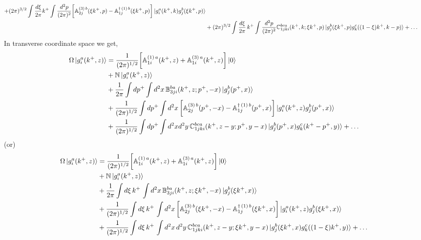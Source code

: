 \documentclass[10pt]{article}
\def\mf#1{\mathbb{#1}}
\numberwithin{equation}{section}
\begin{document}
\begin{itemize}
\begin{align}
    + (2\pi)^{3/2}\int \frac{d\xi}{2\pi} k^{+}\int \frac{d^2p}{(2\pi)^2}  \bigg[\mf{A}^{(3)\, b}_{2j}(\xi k^{+}, p) - \mf{A}^{\dagger\, (1)\, b}_{1j}(\xi k^{+},p)\bigg]  \ket{g^{a}_{i}(k^{+},k)g^{b}_{j}(\xi k^{+},p)} \notag \\ & 
    + (2\pi)^{3/2}\int \frac{d\xi}{2\pi}\, k^{+} \int \frac{d^{2}p}{(2\pi)^{2}}\mf{C}^{bca}_{1jki}(k^{+}, k; \xi k^{+}, p)\ket{g^{b}_{j}(\xi k^{+}, p)g^{c}_{k}((1-\xi)k^{+}, k-p)} %
    + \ldots 
\end{align}
In transverse coordinate space we get,
\begin{align}\label{Omegaongpos}
    \Omega\ket{g^{a}_{i}(k^{+},z)} & = \frac{1}{(2\pi)^{1/2}} \bigg[\mf{A}^{(1)\, a}_{1i}(k^{+},z)+\mf{A}^{(3)\, a}_{1i}(k^{+},z)\bigg]\ket{0} \notag \\ & 
   + 
   \mf{N}\ket{g^{a}_{i}(k^{+},z )} \notag \\ & 
    + \frac{1}{2\pi}\int  dp^{+}  \int d^2x \,\mf{B}^{ba}_{3ji}(k^+, z;p^+, -x)\ket{g^{b}_{j}(p^+, x)} \notag \\ & 
   + \frac{1}{(2\pi)^{1/2}}\int dp^{+}  \int d^{2}x\,\bigg[\mf{A}^{(3)\, b}_{2j}(p^{+},-x) - \mf{A}^{\dagger\, (1)\, b}_{1j}(p^{+},x)\bigg]  \ket{g^{a}_{i}(k^{+}, z)g^{b}_{j}(p^{+}, x)} \notag \\ & 
    + \frac{1}{(2\pi)^{1/2}}\int dp^{+} \int d^{2}x d^{2}y\, \mf{C}^{bca}_{1jki}(k^{+}, z-y; p^{+}, y-x) \ket{g^{b}_{j}(p^{+}, x)g^{c}_{k}(k^{+}-p^{+}, y)}  + \ldots 
\end{align}
(or)
\begin{align}\label{Omegaongposzeta}
    \Omega\ket{g^{a}_{i}(k^{+},z)} & = 
    \frac{1}{(2\pi)^{1/2}} \bigg[\mf{A}^{(1)\, a}_{1i}(k^{+},z)+\mf{A}^{(3)\, a}_{1i}(k^{+},z)\bigg]\ket{0} \notag \\ & + 
    \mf{N}\ket{g^{a}_{i}(k^{+},z )} \notag \\ & 
    + \frac{1}{2\pi}\int  d\xi \, k^{+}\, \int d^2x \,\mf{B}^{ba}_{3ji}(k^+, z;\xi k^+, -x)\ket{g^{b}_{j}(\xi k^+, x)} \notag \\ & 
    + \frac{1}{(2\pi)^{1/2}}\int d\xi\, k^{+}\, \int d^{2}x\, \bigg[\mf{A}^{(3)\, b}_{2j}(\xi k^{+},-x) - \mf{A}^{\dagger\, (1)\, b}_{1j}(\xi k^{+},x)\bigg]  \ket{g^{a}_{i}(k^{+}, z)g^{b}_{j}(\xi k^{+}, x)} \notag \\ & 
    + \frac{1}{(2\pi)^{1/2}}\int d\xi \, k^{+}\, \int d^{2}x\, d^{2}y\, \mf{C}^{bca}_{1jki}(k^{+}, z-y; \xi k^{+}, y-x) \ket{g^{b}_{j}(\xi k^{+}, x)g^{c}_{k}((1-\xi)k^{+}, y)}   + \ldots  
\end{align}
\end{itemize}
\end{document}
